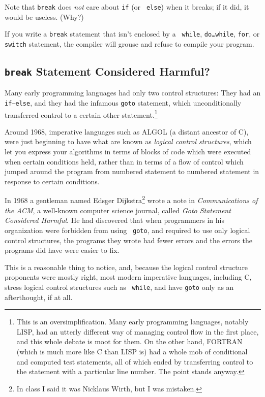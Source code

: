 Note that {\tt break} does {\em not}\/ care about {\tt if} (or {\tt
else}) when it breaks; if it did, it would be useless.  (Why?)

If you write a {\tt break} statement that isn't enclosed by a {\tt
while}, {\tt do{\rm\ldots}while}, {\tt for}, or {\tt switch} statement,
the compiler will grouse and refuse to compile your program.

\subsection{{\tt break} Statement Considered Harmful?}

Many early programming languages had only two control structures: They
had an {\tt if{\rm--}else}, and they had the infamous {\tt goto}
statement, which unconditionally transferred control to a certain other
statement.\footnote{This is an oversimplification.  Many early
programming languages, notably LISP, had an utterly different way of
managing control flow in the first place, and this whole debate is moot
for them.  On the other hand, FORTRAN (which is much more like C than
LISP is) had a whole mob of conditional and computed test statements,
all of which ended by transferring control to the statement with a
particular line number.  The point stands anyway.}

Around 1968, imperative languages such as ALGOL (a distant ancestor of
C), were just beginning to have what are known as {\em logical control
structures}, which let you express your algorithms in terms of blocks of
code which were executed when certain conditions held, rather than in
terms of a flow of control which jumped around the program from
numbered statement to numbered statement in response to certain
conditions.

In 1968 a gentleman named Edsger Dijkstra\footnote{In class I said it
was Nicklaus Wirth, but I was mistaken.} wrote a note in {\em
Communications of the ACM}\/, a well-known computer science journal,
called {\em Goto Statement Considered Harmful}.  He had discovered
that when programmers in his organization were forbidden from using {\tt
goto}, and required to use only logical control structures, the programs
they wrote had fewer errors and the errors the programs did have were
easier to fix.

This is a reasonable thing to notice, and, because the logical control
structure proponents were mostly right, most modern imperative
languages, including C, stress logical control structures such as {\tt
while}, and have {\tt goto} only as an afterthought, if at all.

